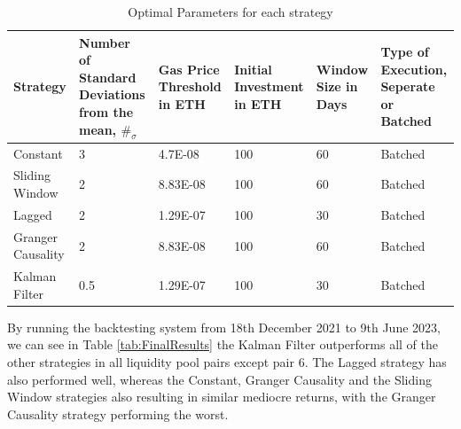 \begin{table}[H]
    \centering
    \begin{tabular}{|p{4em}|p{8em}|p{4em}|p{4em}|p{4em}|p{8em}|}
    \hline
        Strategy & Number of Standard Deviations from the mean, $\#_{\sigma}$ & Gas Price Threshold in ETH & Initial Investment in ETH & Window Size in Days & Type of Execution, Seperate or Batched \\ \hline
        Constant & 3 & 4.7E-08 & 100 & 60 & Batched \\ \hline
        Sliding Window & 2 & 8.83E-08 & 100 & 60 & Batched \\ \hline
        Lagged & 2 & 1.29E-07 & 100 & 30 & Batched \\ \hline
        Granger Causality & 2 & 8.83E-08 & 100 & 60 & Batched \\ \hline
        Kalman Filter & 0.5 & 1.29E-07 & 100 & 30 & Batched \\ \hline
    \end{tabular}
    \caption{Optimal Parameters for each strategy \label{tab:OptimParams}}
\end{table}

By running the backtesting system from 18th December 2021 to 9th June 2023, we can see in Table \ref{tab:FinalResults} the Kalman Filter outperforms all of the other strategies in all liquidity pool pairs except pair 6. The Lagged strategy has also performed well, whereas the Constant, Granger Causality and the Sliding Window strategies also resulting in similar mediocre returns, with the Granger Causality strategy performing the worst.

